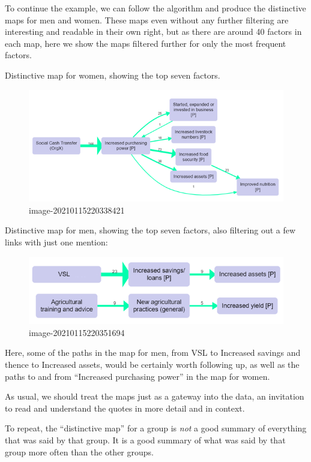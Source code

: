\documentclass[
]{book}
\begin{document}
To continue the example, we can follow the algorithm and produce the distinctive maps for men and women. These maps even without any further filtering are interesting and readable in their own right, but as there are around 40 factors in each map, here we show the maps filtered further for only the most frequent factors.

Distinctive map for women, showing the top seven factors.

\begin{figure}
\centering
\includegraphics{_assets/image-20210115220338421.png}
\caption{image-20210115220338421}
\end{figure}

Distinctive map for men, showing the top seven factors, also filtering out a few links with just one mention:

\begin{figure}
\centering
\includegraphics{_assets/image-20210115220351694.png}
\caption{image-20210115220351694}
\end{figure}

Here, some of the paths in the map for men, from VSL to Increased savings and thence to Increased assets, would be certainly worth following up, as well as the paths to and from ``Increased purchasing power'' in the map for women.

As usual, we should treat the maps just as a gateway into the data, an invitation to read and understand the quotes in more detail and in context.

To repeat, the ``distinctive map'' for a group is \emph{not} a good summary of everything that was said by that group. It is a good summary of what was said by that group more often than the other groups.
\end{document}
